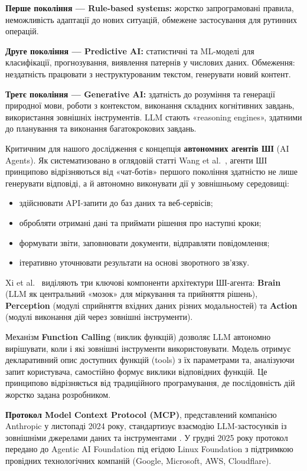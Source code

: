 \textbf{Перше покоління --- Rule-based systems:} жорстко запрограмовані правила, неможливість адаптації до нових ситуацій, обмежене застосування для рутинних операцій.

\textbf{Друге покоління --- Predictive AI:} статистичні та ML-моделі для класифікації, прогнозування, виявлення патернів у числових даних. Обмеження: нездатність працювати з неструктурованим текстом, генерувати новий контент.

\textbf{Третє покоління --- Generative AI:} здатність до розуміння та генерації природної мови, роботи з контекстом, виконання складних когнітивних завдань, використання зовнішніх інструментів. LLM стають «reasoning engines», здатними до планування та виконання багатокрокових завдань.

Критичним для нашого дослідження є концепція \textbf{автономних агентів ШІ} (AI Agents). Як систематизовано в оглядовій статті Wang et al.~\cite{Wang2024SurveyLLMAgents}, агенти ШІ принципово відрізняються від «чат-ботів» першого покоління здатністю не лише генерувати відповіді, а й автономно виконувати дії у зовнішньому середовищі:

\begin{itemize}[leftmargin=*,itemsep=0.2em]
\item здійснювати API-запити до баз даних та веб-сервісів;
\item обробляти отримані дані та приймати рішення про наступні кроки;
\item формувати звіти, заповнювати документи, відправляти повідомлення;
\item ітеративно уточнювати результати на основі зворотного зв'язку.
\end{itemize}

Xi et al.~\cite{Xi2023RisePotentialAgents} виділяють три ключові компоненти архітектури ШІ-агента: \textbf{Brain} (LLM як центральний «мозок» для міркування та прийняття рішень), \textbf{Perception} (модулі сприйняття вхідних даних різних модальностей) та \textbf{Action} (модулі виконання дій через зовнішні інструменти).

Механізм \textbf{Function Calling} (виклик функцій) дозволяє LLM автономно вирішувати, коли і які зовнішні інструменти використовувати. Модель отримує декларативний опис доступних функцій (tools) з їх параметрами та, аналізуючи запит користувача, самостійно формує виклики відповідних функцій. Це принципово відрізняється від традиційного програмування, де послідовність дій жорстко задана розробником.

\textbf{Протокол Model Context Protocol (MCP)}, представлений компанією Anthropic у листопаді 2024 року, стандартизує взаємодію LLM-застосунків із зовнішніми джерелами даних та інструментами \cite{Anthropic2024MCP}. У грудні 2025 року протокол передано до Agentic AI Foundation під егідою Linux Foundation з підтримкою провідних технологічних компаній (Google, Microsoft, AWS, Cloudflare).

